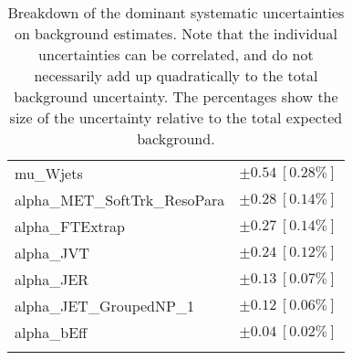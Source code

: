 \begin{table}
\begin{center}
\begin{tabular*}{\textwidth}{@{\extracolsep{\fill}}lc}
mu\_Wjets         & $\pm 0.54\ [0.28\%] $       \\
alpha\_MET\_SoftTrk\_ResoPara         & $\pm 0.28\ [0.14\%] $       \\
alpha\_FTExtrap         & $\pm 0.27\ [0.14\%] $       \\
alpha\_JVT         & $\pm 0.24\ [0.12\%] $       \\
alpha\_JER         & $\pm 0.13\ [0.07\%] $       \\
alpha\_JET\_GroupedNP\_1         & $\pm 0.12\ [0.06\%] $       \\
alpha\_bEff         & $\pm 0.04\ [0.02\%] $       \\
\noalign{\smallskip}\hline\noalign{\smallskip}
\end{tabular*}
\end{center}
\caption[Breakdown of uncertainty on background estimates]{
Breakdown of the dominant systematic uncertainties on background estimates.
Note that the individual uncertainties can be correlated, and do not necessarily add up quadratically to 
the total background uncertainty. The percentages show the size of the uncertainty relative to the total expected background.
\label{table.results.bkgestimate.uncertainties.VRTopD}}
\end{table}
%